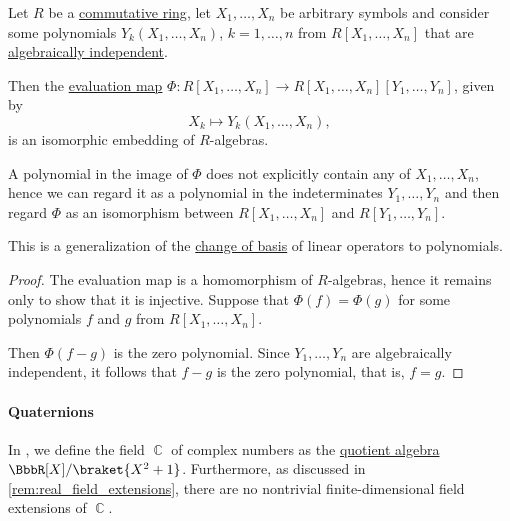 \begin{proposition}\label{thm:change_of_polynomial_basis}
  Let \( R \) be a \hyperref[def:ring/commutative]{commutative ring}, let \( X_1, \ldots, X_n \) be arbitrary symbols and consider some polynomials \( Y_k(X_1, \ldots, X_n) \), \( k = 1, \ldots, n \) from \( R[X_1, \ldots, X_n] \) that are \hyperref[def:algebraic_dependence]{algebraically independent}.

  Then the \hyperref[thm:polynomial_algebra_universal_property]{evaluation map} \( \Phi: R[X_1, \ldots, X_n] \to R[X_1, \ldots, X_n][Y_1, \ldots, Y_n] \), given by
  \begin{equation*}
    X_k \mapsto Y_k(X_1, \ldots, X_n),
  \end{equation*}
  is an isomorphic embedding of \( R \)-algebras.
\end{proposition}
\begin{comments}
  \item A polynomial in the image of \( \Phi \) does not explicitly contain any of \( X_1, \ldots, X_n \), hence we can regard it as a polynomial in the indeterminates \( Y_1, \ldots, Y_n \) and then regard \( \Phi \) as an isomorphism between \( R[X_1, \ldots, X_n] \) and \( R[Y_1, \ldots, Y_n] \).

  \item This is a generalization of the \hyperref[con:change_of_basis]{change of basis} of linear operators to polynomials.
\end{comments}
\begin{proof}
  The evaluation map is a homomorphism of \( R \)-algebras, hence it remains only to show that it is injective. Suppose that \( \Phi(f) = \Phi(g) \) for some polynomials \( f \) and \( g \) from \( R[X_1, \ldots, X_n] \).

  Then \( \Phi(f - g) \) is the zero polynomial. Since \( Y_1, \ldots, Y_n \) are algebraically independent, it follows that \( f - g \) is the zero polynomial, that is, \( f = g \).
\end{proof}

\paragraph{Quaternions}

In , we define the field \( \BbbC \) of complex numbers as the \hyperref[def:algebra_over_ring/quotient]{quotient algebra} \( \BbbR[X] / \braket{ X^2 + 1 } \). Furthermore, as discussed in \cref{rem:real_field_extensions}, there are no nontrivial finite-dimensional field extensions of \( \BbbC \).

